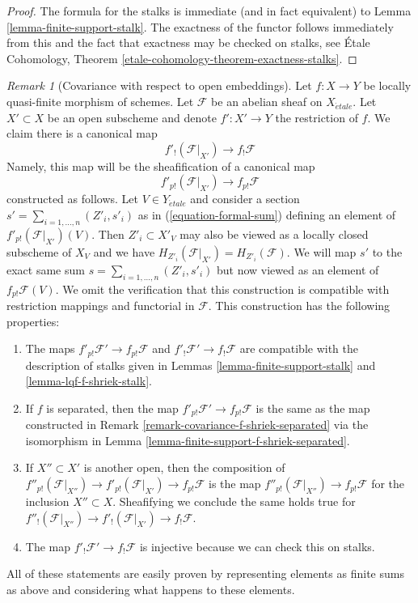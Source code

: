 \documentclass{stacks-project}
\theoremstyle{plain}
\theoremstyle{definition}
\theoremstyle{remark}
\newtheorem{remark}[subsection]{Remark}
\numberwithin{equation}{subsection}
\def\etale{{\acute{e}tale}}
\begin{document}
\begin{proof}
The formula for the stalks is immediate (and in fact equivalent) to
Lemma \ref{lemma-finite-support-stalk}.
The exactness of the functor follows immediately from this
and the fact that exactness may be checked on stalks, see
\'Etale Cohomology, Theorem \ref{etale-cohomology-theorem-exactness-stalks}.
\end{proof}

\begin{remark}[Covariance with respect to open embeddings]
\label{remark-covariance-lqf-f-shriek}
Let $f : X \to Y$ be locally quasi-finite morphism of schemes. Let
$\mathcal{F}$ be an abelian sheaf on $X_\etale$.
Let $X' \subset X$ be an open subscheme and denote $f' : X' \to Y$
the restriction of $f$.
We claim there is a canonical map
$$
f'_!(\mathcal{F}|_{X'}) \longrightarrow f_!\mathcal{F}
$$
Namely, this map will be the sheafification of a canonical map
$$
f'_{p!}(\mathcal{F}|_{X'}) \to f_{p!}\mathcal{F}
$$
constructed as follows. Let $V \in Y_\etale$ and consider a section
$s' = \sum_{i = 1, \ldots, n} (Z'_i, s'_i)$ as in
(\ref{equation-formal-sum}) defining an element of
$f'_{p!}(\mathcal{F}|_{X'})(V)$.
Then $Z'_i \subset X'_V$ may also be viewed as a locally closed subscheme
of $X_V$ and we have $H_{Z'_i}(\mathcal{F}|_{X'}) = H_{Z'_i}(\mathcal{F})$.
We will map $s'$ to the exact same sum
$s = \sum_{i = 1, \ldots, n} (Z'_i, s'_i)$
but now viewed as an element of $f_{p!}\mathcal{F}(V)$.
We omit the verification that this construction is compatible with
restriction mappings and functorial in $\mathcal{F}$.
This construction has the following properties:
\begin{enumerate}
\item The maps $f'_{p!}\mathcal{F}' \to f_{p!}\mathcal{F}$ and
$f'_!\mathcal{F}' \to f_!\mathcal{F}$ are compatible with
the description of stalks given in Lemmas
\ref{lemma-finite-support-stalk} and \ref{lemma-lqf-f-shriek-stalk}.
\item If $f$ is separated, then the map
$f'_{p!}\mathcal{F}' \to f_{p!}\mathcal{F}$ is the same as the map
constructed in Remark \ref{remark-covariance-f-shriek-separated}
via the isomorphism in Lemma \ref{lemma-finite-support-f-shriek-separated}.
\item If $X'' \subset X'$ is another open, then the composition of
$f''_{p!}(\mathcal{F}|_{X''}) \to f'_{p!}(\mathcal{F}|_{X'}) \to
f_{p!}\mathcal{F}$ is the map
$f''_{p!}(\mathcal{F}|_{X''}) \to f_{p!}\mathcal{F}$ for the
inclusion $X'' \subset X$. Sheafifying we conclude
the same holds true for
$f''_!(\mathcal{F}|_{X''}) \to f'_!(\mathcal{F}|_{X'}) \to f_!\mathcal{F}$.
\item The map $f'_!\mathcal{F}' \to f_!\mathcal{F}$ is injective
because we can check this on stalks.
\end{enumerate}
All of these statements are easily proven by representing elements
as finite sums as above and considering what happens to these elements.
\end{remark}
\end{document}
